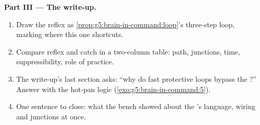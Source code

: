 \begin{problem}
\medskip\noindent\textbf{Part III --- The write-up.}
\begin{enumerate}[resume]
  \item Draw the reflex as
        \cref{prop:g5:brain-in-command:loop}'s three-step
        loop, marking where this one shortcuts.
  \item Compare reflex and catch in a two-column table:
        path, junctions, time, suppressibility, role of
        practice.
  \item The write-up's last section asks: ``why do fast
        protective loops bypass the ?'' Answer with
        the hot-pan logic
        (\cref{exo:g5:brain-in-command:5}).
  \item One sentence to close: what the bench showed
        about the 's language, wiring and
        junctions at once.
\end{enumerate}
\end{problem}
